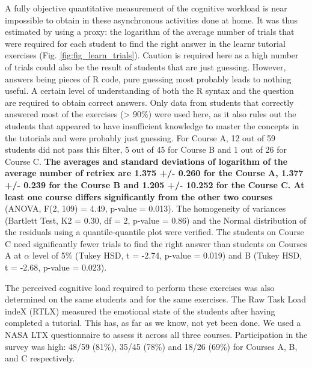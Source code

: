 \documentclass{aims}
\theoremstyle{definition}
\begin{document}
A fully objective quantitative measurement of the cognitive workload is
near impossible to obtain in these asynchronous activities done at home.
It was thus estimated by using a proxy: the logarithm of the average
number of trials that were required for each student to find the right
answer in the learnr tutorial exercises (Fig.
\ref {fig:fig_learn_trials}). Caution is required here as a high number
of trials could also be the result of students that are just guessing.
However, answers being pieces of R code, pure guessing most probably
leads to nothing useful. A certain level of understanding of both the R
syntax and the question are required to obtain correct answers. Only
data from students that correctly answered most of the exercises
(\textgreater{} 90\%) were used here, as it also rules out the students
that appeared to have insufficient knowledge to master the concepts in
the tutorials and were probably just guessing. For Course A, 12 out of
59 students did not pass this filter, 5 out of 45 for Course B and 1 out
of 26 for Course C. \textbf{The averages and standard deviations of
logarithm of the average number of retriex are 1.375 +/- 0.260 for the
Course A, 1.377 +/- 0.239 for the Course B and 1.205 +/- 10.252 for the
Course C. At least one course differs significantly from the other two
courses} (ANOVA, F(2, 109) = 4.49, p-value = 0.013). The homogeneity of
variances (Bartlett Test, K2 = 0.30, df = 2, p-value = 0.86) and the
Normal distribution of the residuals using a quantile-quantile plot were
verified. The students on Course C need significantly fewer trials to
find the right answer than students on Courses A at \(\alpha\) level of
5\% (Tukey HSD, t = -2.74, p-value = 0.019) and B (Tukey HSD, t = -2.68,
p-value = 0.023).

The perceived cognitive load required to perform these exercises was
also determined on the same students and for the same exercises. The Raw
Task Load indeX (RTLX) measured the emotional state of the students
after having completed a tutorial. This has, as far as we know, not yet
been done. We used a NASA LTX questionnaire to assess it across all
three courses. Participation in the survey was high: 48/59 (81\%), 35/45
(78\%) and 18/26 (69\%) for Courses A, B, and C respectively.
\end{document}
